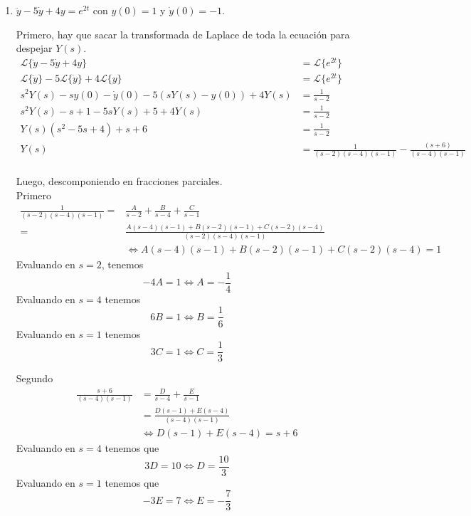 \documentclass{article}
\begin{document}
\begin{enumerate}
        \item {
            $\ddot y - 5 \dot y + 4y = e^{2t}$ con $y(0) = 1$ y $\dot y(0) = -1$.

            \color{azul}
            Primero, hay que sacar la transformada de Laplace de toda la ecuación
            para despejar $Y(s)$.
            \begin{align*}
                \mathcal{L}\{\ddot y - 5 \dot y + 4y\} &= \mathcal{L}\{e^{2t}\} \\
                \mathcal{L}\{\ddot y\} - 5\mathcal{L}\{\dot y\} + 4 \mathcal{L}\{y\}
                &= \mathcal{L}\{e^{2t}\} \\
                s^2 Y(s) - s y(0) - \dot y(0) - 5 (sY(s) - y(0)) + 4Y(s) 
                &= \frac{1}{s - 2} \\
                s^2 Y(s) - s + 1 - 5s Y(s) + 5 + 4 Y(s) &= \frac{1}{s - 2} \\
                Y(s) (s^2 - 5s + 4) + s + 6 &= \frac{1}{s - 2} \\
                Y(s) &= \frac{1}{(s-2)(s-4)(s-1)} - \frac{(s+6)}{(s-4)(s-1)}\\
            \end{align*}

            Luego, descomponiendo en fracciones parciales.\\
            Primero
            \begin{align*}
                \frac{1}{(s-2)(s-4)(s-1)}=&\frac{A}{s-2} + \frac{B}{s-4} + \frac{C}{s-1} \\
                =&\frac{A(s-4)(s-1) + B(s-2)(s-1) + C(s-2)(s-4)}{(s-2)(s-4)(s-1)} \\
                &\iff A(s-4)(s-1) + B(s-2)(s-1) + C(s-2)(s-4) = 1
            \end{align*}
            Evaluando en $s = 2$, tenemos
            \[-4A = 1 \iff A = -\frac{1}{4}\]
            Evaluando en $s = 4$ tenemos
            \[6B = 1 \iff B = \frac{1}{6}\]
            Evaluando en $s = 1$ tenemos
            \[3C = 1 \iff C = \frac{1}{3}\]

            Segundo
            \begin{align*}
                \frac{s+6}{(s-4)(s-1)} &= \frac{D}{s-4} + \frac{E}{s-1} \\
                &= \frac{D(s-1) + E(s-4)}{(s-4)(s-1)} \\
                &\iff D(s-1) + E(s-4) = s+6
            \end{align*}
            Evaluando en $s = 4$ tenemos que
            \[3D = 10 \iff D = \frac{10}{3}\]
            Evaluando en $s = 1$ tenemos que
            \[-3E = 7 \iff E = -\frac{7}{3}\]

}
\end{enumerate}
\end{document}
